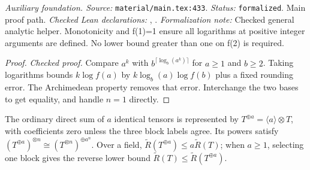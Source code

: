 \noindent\textit{Auxiliary foundation. Source:} \texttt{material/main.tex:433}.
\textit{Status:} \texttt{formalized}. Main proof path.
\textit{Checked Lean declarations:} , .
\textit{Formalization note:} Checked general analytic helper. Monotonicity and f(1)=1 ensure all logarithms at positive integer arguments are defined. No lower bound greater than one on f(2) is required.

\begin{proof}
\leanok
\textit{Checked proof.} Compare $a^k$ with $b^{\lceil\log_b(a^k)\rceil}$ for $a\ge1$ and $b\ge2$. Taking logarithms bounds $k\log f(a)$ by $k\log_b(a)\log f(b)$ plus a fixed rounding error. The Archimedean property removes that error. Interchange the two bases to get equality, and handle $n=1$ directly.
\end{proof}

\renewcommand{\thetheorem}{A45}
\begin{lemma}
\label{aux:direct-sum-copies}
\leanok
The ordinary direct sum of $a$ identical tensors is represented by $T^{\oplus a}=\langle a\rangle\otimes T$, with coefficients zero unless the three block labels agree. Its powers satisfy $(T^{\oplus a})^{\otimes n}\cong(T^{\otimes n})^{\oplus a^n}$. Over a field, $\widetilde R(T^{\oplus a})\le a\widetilde R(T)$; when $a\ge1$, selecting one block gives the reverse lower bound $\widetilde R(T)\le\widetilde R(T^{\oplus a})$.
\end{lemma}

